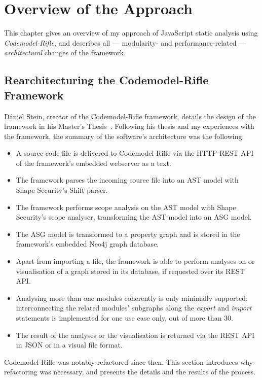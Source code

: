 \chapter{Overview of the Approach}
\label{chapter:overview}

This chapter gives an overview of my approach of JavaScript static analysis using \emph{Codemodel-Rifle}, and describes all — modularity- and performance-related — \emph{architectural} changes of the framework.


\section{Rearchitecturing the Codemodel-Rifle Framework}

Dániel Stein, creator of the Codemodel-Rifle framework, details the design of the framework in his Master's Thesis~\cite{stein-daniel-msc}. Following his thesis and my experiences with the framework, the summary of the software's architecture was the following:

\begin{itemize}
\item A source code file is delivered to Codemodel-Rifle via the HTTP REST API of the framework's embedded webserver as a text.
\item The framework parses the incoming source file into an AST model with Shape Security's Shift parser.
\item The framework performs scope analysis on the AST model with Shape Security's scope analyser, transforming the AST model into an ASG model.
\item The ASG model is transformed to a property graph and is stored in the framework's embedded Neo4j graph database.
\item Apart from importing a file, the framework is able to perform analyses on or visualisation of a graph stored in its database, if requested over its REST API.
\item Analysing more than one \es modules coherently is only minimally supported: interconnecting the related modules' subgraphs along the \emph{export} and \emph{import} \es statements is implemented for one use case only, out of more than 30.
\item The result of the analyses or the visualisation is returned via the REST API in JSON or in a visual file format.
\end{itemize}

Codemodel-Rifle was notably refactored since then. This section introduces why refactoring was necessary, and presents the details and the results of the process.


